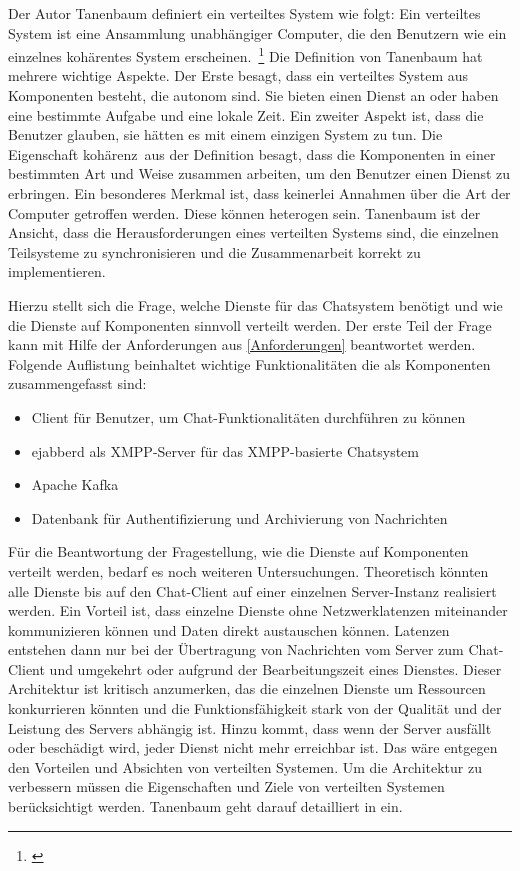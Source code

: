 \documentclass[a4paper,titlepage,halfparskip,12pt]{scrreprt}
\begin{document}
\begin{onehalfspacing}
Der Autor Tanenbaum definiert ein verteiltes System wie folgt: \glqq Ein verteiltes System ist eine Ansammlung unabhängiger Computer, die den Benutzern wie ein einzelnes kohärentes System erscheinen.\grqq\ \footnote{\cite[S.19]{andrew2008verteilte}} Die Definition von Tanenbaum hat mehrere wichtige Aspekte. Der Erste besagt, dass ein verteiltes System aus Komponenten besteht, die autonom sind. Sie bieten einen Dienst an oder haben eine bestimmte Aufgabe und eine lokale Zeit. Ein zweiter Aspekt ist, dass die Benutzer glauben, sie hätten es mit einem einzigen System zu tun. Die Eigenschaft \glqq kohärenz\grqq\ aus der Definition besagt, dass die Komponenten in einer bestimmten Art und Weise zusammen arbeiten, um den Benutzer einen Dienst zu erbringen. Ein besonderes Merkmal ist, dass keinerlei Annahmen über die Art der Computer getroffen werden. Diese können heterogen sein. Tanenbaum \cite{andrew2008verteilte} ist der Ansicht, dass die Herausforderungen eines verteilten Systems sind, die einzelnen Teilsysteme zu synchronisieren und die Zusammenarbeit korrekt zu implementieren.

Hierzu stellt sich die Frage, welche Dienste für das Chatsystem benötigt und wie die Dienste auf Komponenten sinnvoll verteilt werden. Der erste Teil der Frage kann mit Hilfe der Anforderungen aus \autoref{Anforderungen} beantwortet werden. Folgende Auflistung beinhaltet wichtige Funktionalitäten die als Komponenten zusammengefasst sind:

\begin{itemize}
\item Client für Benutzer, um Chat-Funktionalitäten durchführen zu können
\item ejabberd als \ac{XMPP}-Server für das \ac{XMPP}-basierte Chatsystem
\item Apache Kafka
\item Datenbank für Authentifizierung und Archivierung von Nachrichten
\end{itemize}

\newpage

Für die Beantwortung der Fragestellung, wie die Dienste auf Komponenten verteilt werden, bedarf es noch weiteren Untersuchungen. Theoretisch könnten alle Dienste bis auf den Chat-Client auf einer einzelnen Server-Instanz realisiert werden. Ein Vorteil ist, dass einzelne Dienste ohne Netzwerklatenzen miteinander kommunizieren können und Daten direkt austauschen können. Latenzen entstehen dann nur bei der Übertragung von Nachrichten vom Server zum Chat-Client und umgekehrt oder aufgrund der Bearbeitungszeit eines Dienstes. Dieser Architektur ist kritisch anzumerken, das die einzelnen Dienste um Ressourcen konkurrieren könnten und die Funktionsfähigkeit stark von der Qualität und der Leistung des Servers abhängig ist. Hinzu kommt, dass wenn der Server ausfällt oder beschädigt wird, jeder Dienst nicht mehr erreichbar ist. Das wäre entgegen den Vorteilen und Absichten von verteilten Systemen. Um die Architektur zu verbessern müssen die Eigenschaften und Ziele von verteilten Systemen berücksichtigt werden. Tanenbaum geht darauf detailliert in \cite{andrew2008verteilte} ein.


\end{onehalfspacing}
\end{document}
